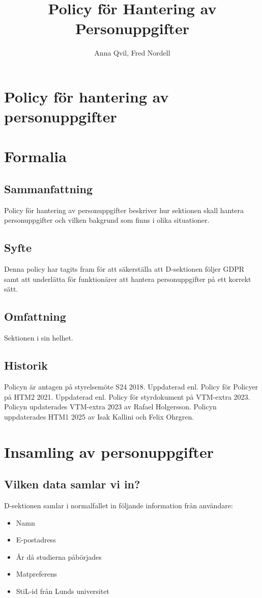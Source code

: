 \documentclass{dsekprotokoll}
\title{Policy för Hantering av Personuppgifter}
\author{Anna Qvil, Fred Nordell}
\begin{document}
\section*{Policy för hantering av personuppgifter}
\section{Formalia}
\subsection{Sammanfattning}
Policy för hantering av personuppgifter beskriver hur sektionen skall hantera personuppgifter och vilken bakgrund som finns i olika situationer.
\subsection{Syfte}

Denna policy har tagits fram för att säkerställa att D-sektionen följer GDPR samt att underlätta för funktionärer att hantera personuppgifter på ett korrekt sätt.
\subsection{Omfattning}
Sektionen i sin helhet.
\subsection{Historik}
Policyn är antagen på styrelsemöte S24 2018.
Uppdaterad enl. Policy för Policyer på HTM2 2021. Uppdaterad enl. Policy för styrdokument på VTM-extra 2023. Policyn updaterades VTM-extra 2023 av Rafael Holgersson. Policyn uppdaterades HTM1 2025 av Isak Kallini och Felix
Ohrgren.

\section{Insamling av personuppgifter}

\subsection{Vilken data samlar vi in?}

D-sektionen samlar i normalfallet in följande information från användare:
\begin{itemize}
    \item Namn
    \item E-postadress
    \item År då studierna påbörjades
    \item Matpreferens
    \item StiL-id från Lunds universitet
\end{itemize}
\end{document}
